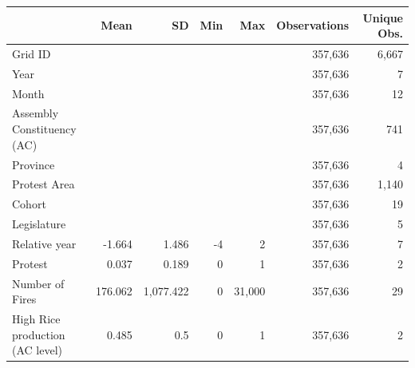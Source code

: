 \begin{tabular}{lrrrrrr}
\toprule
 & Mean & SD & Min & Max & Observations & Unique Obs.\\
\midrule
Grid ID &  &  &  &  & 357,636 & 6,667\\
Year &  &  &  &  & 357,636 & 7\\
Month &  &  &  &  & 357,636 & 12\\
Assembly Constituency (AC) &  &  &  &  & 357,636 & 741\\
Province &  &  &  &  & 357,636 & 4\\
Protest Area &  &  &  &  & 357,636 & 1,140\\
Cohort &  &  &  &  & 357,636 & 19\\
Legislature &  &  &  &  & 357,636 & 5\\
Relative year & -1.664 & 1.486 & -4 & 2 & 357,636 & 7\\
Protest & 0.037 & 0.189 & 0 & 1 & 357,636 & 2\\
Number of Fires & 176.062 & 1,077.422 & 0 & 31,000 & 357,636 & 29\\
High Rice production (AC level) & 0.485 & 0.5 & 0 & 1 & 357,636 & 2\\
\bottomrule
\end{tabular}
